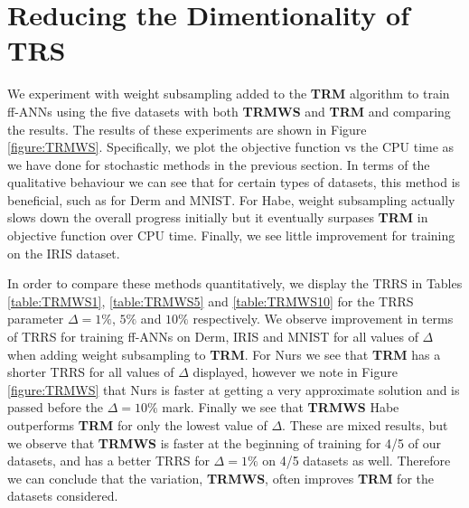 \documentclass[letterpaper,12pt,titlepage,oneside,final]{book}
\begin{document}
	
	\section{Reducing the Dimentionality of TRS}
	
	We experiment with weight subsampling added to the \textbf{TRM} algorithm to train ff-ANNs using the five datasets with both \textbf{TRMWS} and \textbf{TRM} and comparing the results. The results of these experiments are shown in Figure \ref{figure:TRMWS}. Specifically, we plot the objective function vs the CPU time as we have done for stochastic methods in the previous section. In terms of the qualitative behaviour we can see that for certain types of datasets, this method is beneficial, such as for Derm and MNIST. For Habe, weight subsampling actually slows down the overall progress initially but it eventually surpases \textbf{TRM} in objective function over CPU time. Finally, we see little improvement for training on the IRIS dataset. 
	
	In order to compare these methods quantitatively, we display the TRRS in Tables \ref{table:TRMWS1}, \ref{table:TRMWS5} and \ref{table:TRMWS10} for the TRRS parameter $\Delta = 1\%$, $5\%$ and $10\%$ respectively. We observe improvement in terms of TRRS for training ff-ANNs on Derm, IRIS and MNIST for all values of $\Delta$ when adding weight subsampling to \textbf{TRM}. For Nurs we see that \textbf{TRM} has a shorter TRRS for all values of $\Delta$ displayed, however we note in Figure \ref{figure:TRMWS} that Nurs is faster at getting a very approximate solution and is passed before the $\Delta=10\%$ mark. Finally we see that \textbf{TRMWS} Habe outperforms \textbf{TRM} for only the lowest value of $\Delta$. These are mixed results, but we observe that \textbf{TRMWS} is faster at the beginning of training for 4/5 of our datasets, and has a better TRRS for $\Delta=1\%$ on 4/5 datasets as well. Therefore we can conclude that the variation, \textbf{TRMWS}, often improves \textbf{TRM} for the datasets considered.
	
\end{document}
